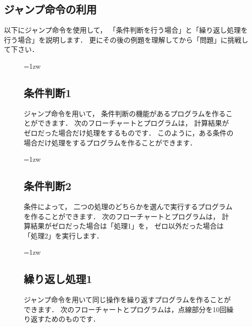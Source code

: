 \subsection{ジャンプ命令の利用}

以下にジャンプ命令を使用して，
「条件判断を行う場合」と「繰り返し処理を行う場合」を説明します．
更にその後の例題を理解してから「問題」に挑戦して下さい．

\begin{figure}[btp]
\begin{framed}{\parindent=1zw
\subsection*{条件判断1}
ジャンプ命令を用いて，
条件判断の機能があるプログラムを作ることができます．
次のフローチャートとプログラムは，
計算結果がゼロだった場合だけ処理をするものです．
このように，ある条件の場合だけ処理をするプログラムを作ることができます．

\begin{center}
\end{center}
}\end{framed}
\end{figure}

\begin{figure}[btp]
\begin{framed}{\parindent=1zw
\subsection*{条件判断2}
条件によって，
二つの処理のどちらかを選んで実行するプログラムを作ることができます．
次のフローチャートとプログラムは，
計算結果がゼロだった場合は「処理1」を，
ゼロ以外だった場合は「処理2」を実行します．

\begin{center}
\end{center}
}\end{framed}
\end{figure}

\begin{figure}[btp]
\begin{framed}{\parindent=1zw
\subsection*{繰り返し処理1}
ジャンプ命令を用いて同じ操作を繰り返すプログラムを作ることができます．
次のフローチャートとプログラムは，点線部分を10回繰り返すためのものです．

\begin{center}
\end{center}
}\end{framed}
\end{figure}


